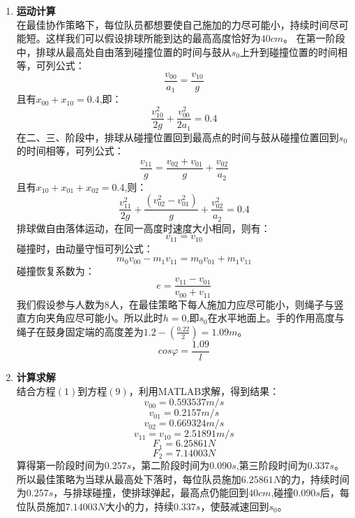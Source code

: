 \documentclass{cumcm}
\begin{document}
\begin{enumerate}
\item \textbf{运动计算}\\
在最佳协作策略下，每位队员都想要使自己施加的力尽可能小，持续时间尽可能短。这样我们可以假设排球所能到达的最高高度恰好为$40cm$。
在第一阶段中，排球从最高处自由落到碰撞位置的时间与鼓从$s_0$上升到碰撞位置的时间相等，可列公式：
\begin{equation}
\frac{v_{00}}{a_1}=\frac{v_{10}}{g}
\end{equation}
且有$x_{00}+x_{10}=0.4$,即：
\begin{equation}
\frac{v^2_{10}}{2g}+\frac{v^2_{00}}{2a_1}=0.4
\end{equation}
在二、三、阶段中，排球从碰撞位置回到最高点的时间与鼓从碰撞位置回到$s_0$的时间相等，可列公式：
\begin{equation}
\frac{v_{11}}{g}=\frac{v_{02}+v_{01}}{g}+\frac{v_{02}}{a_2}
\end{equation}
且有$x_{10}+x_{01}+x_{02}=0.4$,则：
\begin{equation}
\frac{v^2_{11}}{2g}+\frac{(v^2_{02}-v^2_{01})}{g}+\frac{v^2_{02}}{a_2}=0.4
\end{equation}
排球做自由落体运动，在同一高度时速度大小相同，则有：
\begin{equation}
v_{11}=v_{10}
\end{equation}
碰撞时，由动量守恒可列公式：
\begin{equation}
m_0v_{00}-m_1v_{11}=m_0v_{01}+m_1v_{11}
\end{equation}
碰撞恢复系数为：
\begin{equation}
e=\frac{v_{11}-v_{01}}{v_{00}+v_{11}}
\end{equation}
我们假设参与人数为$8$人，在最佳策略下每人施加力应尽可能小，则绳子与竖直方向夹角应尽可能小。所以此时$h=0$,即$s_0$在水平地面上。手的作用高度与绳子在鼓身固定端的高度差为$1.2-(\frac{0.22}{2})=1.09m$。
\begin{equation}
cos\varphi=\frac{1.09}{l}
\end{equation}
\item \textbf{计算求解}\\
结合方程$(1)$到方程$(9)$，利用MATLAB求解，得到结果：
$$v_{00}=0.593537m/s$$
$$v_{01}=0.2157m/s$$
$$v_{02}=0.669324m/s$$
$$v_{11}=v_{10}=2.51891m/s$$
$$F_1=6.25861N$$ 
$$F_2=7.14003N$$
\quad \quad
算得第一阶段时间为$0.257s$，第二阶段时间为$0.090s$,第三阶段时间为$0.337s$。
所以最佳策略为当球从最高处下落时，每位队员施加$6.25861N$的力，持续时间为$0.257s$，与排球碰撞，使排球弹起，最高点仍能回到$40cm$,碰撞$0.090s$后，每位队员施加$7.14003N$大小的力，持续$0.337s$，使鼓减速回到$s_0$。
\end{enumerate}
\end{document}

